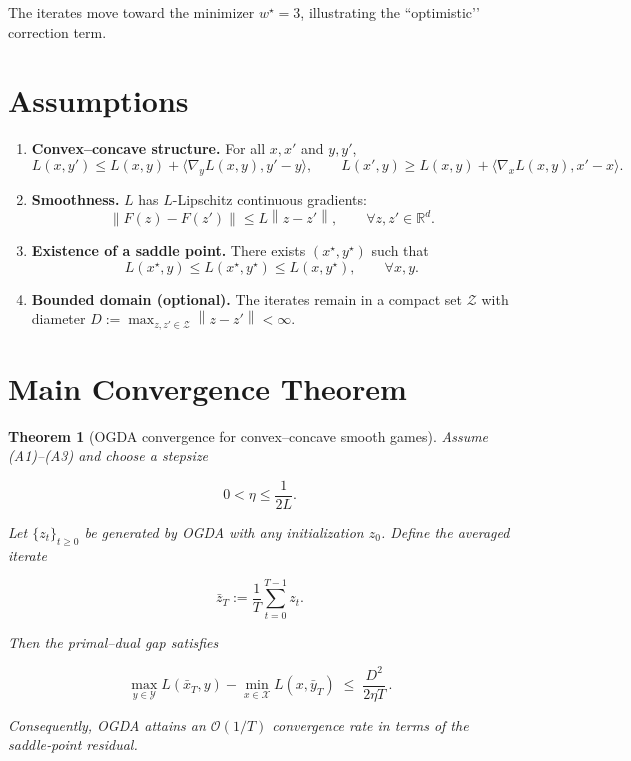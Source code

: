 \documentclass{article}
\newtheorem{theorem}{Theorem}
\newcommand{\norm}[1]{\left\|#1\right\|}
\begin{document}
The iterates move toward the minimizer \(w^\star=3\), illustrating the “optimistic’’ correction term.

\newpage
\section*{Assumptions}
\begin{enumerate}[label=(A\arabic*)]
\item \textbf{Convex–concave structure.} For all \(x,x'\) and \(y,y'\),
\[
L(x,y')\le L(x,y)+\langle\nabla_y L(x,y),y'-y\rangle,
\qquad
L(x',y)\ge L(x,y)+\langle\nabla_x L(x,y),x'-x\rangle .
\]
\item \textbf{Smoothness.} \(L\) has \(L\)-Lipschitz continuous gradients:
\[
\norm{F(z)-F(z')}\le L\norm{z-z'},\qquad\forall z,z'\in\mathbb{R}^{d}.
\]
\item \textbf{Existence of a saddle point.} There exists \((x^\star,y^\star)\) such that
\[
L(x^\star,y)\le L(x^\star,y^\star)\le L(x,y^\star),\qquad\forall x,y.
\]
\item \textbf{Bounded domain (optional).} The iterates remain in a compact set
\(\mathcal{Z}\) with diameter \(D:=\max_{z,z'\in\mathcal{Z}}\norm{z-z'}<\infty\).
\end{enumerate}

\section*{Main Convergence Theorem}
\begin{theorem}[OGDA convergence for convex–concave smooth games]\label{thm:ogda}
Assume (A1)–(A3) and choose a stepsize  

\[
0<\eta\le\frac{1}{2L}.
\]

Let \(\{z_t\}_{t\ge0}\) be generated by OGDA with any initialization \(z_0\).  
Define the averaged iterate  

\[
\bar z_T:=\frac{1}{T}\sum_{t=0}^{T-1}z_t .
\]

Then the primal–dual gap satisfies  

\[
\boxed{
\max_{y\in\mathcal{Y}}L(\bar x_T,y)-\min_{x\in\mathcal{X}}L(x,\bar y_T)
\;\le\;
\frac{D^{2}}{2\eta T}\, .
}
\tag{1}
\]

Consequently, OGDA attains an \(\mathcal{O}(1/T)\) convergence rate in terms of the
saddle‑point residual.
\end{theorem}
\end{document}
